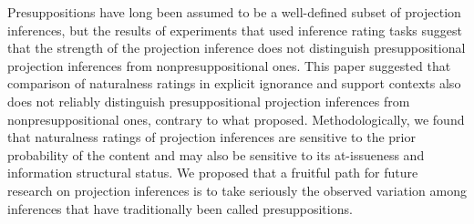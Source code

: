 \documentclass[11pt,fleqn]{article}
\newcommand{\6}{\mbox{$[\hspace*{-.6mm}[$}}
\newcommand{\9}{\mbox{$]\hspace*{-.6mm}]$}}
\begin{document}
Presuppositions have long been assumed to be a well-defined subset of projection inferences, but the results of experiments that used inference rating tasks suggest that the strength of the projection inference does not distinguish presuppositional projection inferences from nonpresuppositional ones. This paper suggested that comparison of naturalness ratings in explicit ignorance and support contexts also does not reliably distinguish presuppositional projection inferences from nonpresuppositional ones, contrary to what \citealt{mandelkern-etal2020} proposed. Methodologically, we found that naturalness ratings of projection inferences are sensitive to the prior probability of the content and may also be sensitive to its at-issueness and information structural status. We proposed that a fruitful path for future research on projection inferences is to take seriously the observed variation among inferences that have traditionally been called presuppositions.



%

%



 
\end{document}
